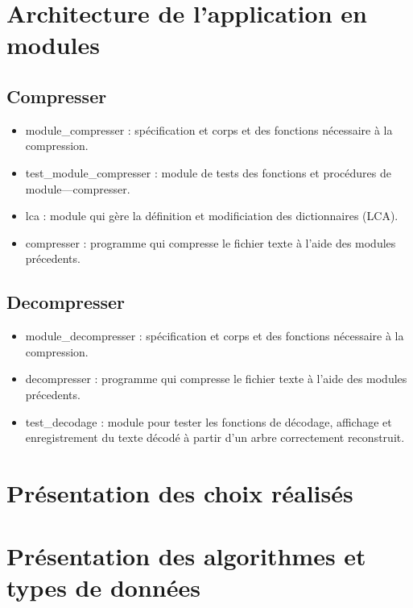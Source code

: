 \documentclass{article}
\begin{document}
\section{Architecture de l'application en modules}
\subsection{Compresser}
\begin{itemize}
    \item module\_compresser : spécification et corps et des fonctions nécessaire à la compression.
    \item test\_module\_compresser : module de tests des fonctions et procédures de module---compresser. 
    \item lca : module qui gère la définition et modificiation des dictionnaires (LCA).
    \item compresser : programme qui compresse le fichier texte à l'aide des modules précedents.
\end{itemize}
\subsection{Decompresser}
\begin{itemize}
    \item module\_decompresser : spécification et corps et des fonctions nécessaire à la compression.
    \item decompresser : programme qui compresse le fichier texte à l'aide des modules précedents.
    \item test\_decodage : module pour tester les fonctions de décodage, affichage et enregistrement du texte décodé à partir d'un arbre correctement reconstruit. 
\end{itemize}



\section{Présentation des choix réalisés}



\section{Présentation des algorithmes et types de données}
\end{document}
